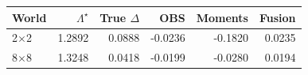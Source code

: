 \begin{tabular}{@{}lrrrrr@{}}
\toprule
World & $\Lambda^\star$ & True $\Delta$ & OBS & Moments & Fusion\\
\midrule
2$\times$2 & 1.2892 & 0.0888 & -0.0236 & -0.1820 & 0.0235 \\
8$\times$8 & 1.3248 & 0.0418 & -0.0199 & -0.0280 & 0.0194 \\
\bottomrule
\end{tabular}
